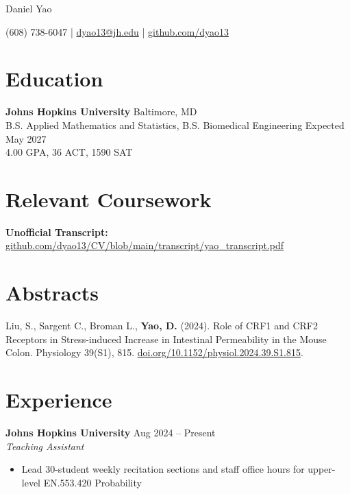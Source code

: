 \documentclass[11pt]{article}       %
\begin{document}
\centerline{\Huge Daniel Yao}

\vspace{5pt}

\centerline{(608) 738-6047 | \href{mailto:dyao13@jh.edu}{dyao13@jh.edu} | \href{https://github.com/dyao13/}{github.com/dyao13}}

\vspace{-9pt}

\section*{Education}
\textbf{Johns Hopkins University} \hfill Baltimore, MD \\
B.S. Applied Mathematics and Statistics, B.S. Biomedical Engineering \hfill Expected May 2027 \\
4.00 GPA, 36 ACT, 1590 SAT

\vspace{-9pt}

\section*{Relevant Coursework}
\textbf{Unofficial Transcript:} \href{https://github.com/dyao13/CV/blob/main/transcript/yao_transcript.pdf}{github.com/dyao13/CV/blob/main/transcript/yao\_transcript.pdf}

\vspace{-9pt}

\section*{Abstracts}
Liu, S., Sargent C., Broman L., \textbf{Yao, D.} (2024). Role of CRF1 and CRF2 Receptors in Stress-induced Increase in Intestinal Permeability in the Mouse Colon. Physiology 39(S1), 815. \href{https://doi.org/10.1152/physiol.2024.39.S1.815}{doi.org/10.1152/physiol.2024.39.S1.815}.

\vspace{-9pt}

\section*{Experience}
\textbf{Johns Hopkins University} \hfill Aug 2024 – Present \\
\textit{Teaching Assistant} \vspace{-9pt} \\
\begin{itemize}
  \item Lead 30-student weekly recitation sections and staff office hours for upper-level EN.553.420 Probability
\end{itemize}
\end{document}
